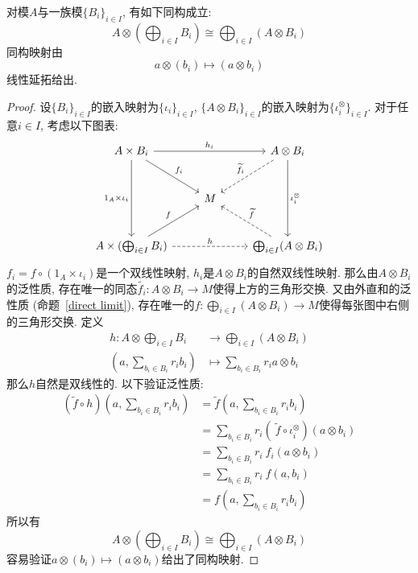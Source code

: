 \begin{prop}[分配律]\label{distribution}
    对模$A$与一族模$\{B_i\}_{i\in I}$, 有如下同构成立:
    \[A\otimes\left(\bigoplus_{i\in I}B_i\right)\cong\bigoplus_{i\in I}(A\otimes B_i)\]
    同构映射由
    \[a\otimes(b_i)\mapsto(a\otimes b_i)\]
    线性延拓给出.
\end{prop}
\begin{proof}
    设$\{B_i\}_{i\in I}$的嵌入映射为$\{\iota_i\}_{i\in I}$, $\{A\otimes B_i\}_{i\in I}$的嵌入映射为$\{\iota^\otimes_i\}_{i\in I}$.
    对于任意$i\in I$, 考虑以下图表:
    \[\begin{tikzcd}[row sep =large]
        A\times B_i \arrow[dd, "1_A\times\iota_i"'] \arrow[dr, "f_i"] \arrow[rr, "h_i"] & &
        A\otimes B_i \arrow[dl, dashed, "\widetilde{f_i}"'] \arrow[dd, "\iota^\otimes_i"] \\
        & M & \\
        A\times(\bigoplus_{i\in I}B_i) \arrow[ur, "f"] \arrow[rr, dashed, "h"] & &
        \bigoplus_{i\in I}(A\otimes B_i) \arrow[ul, dashed, "\widetilde{f}"']
    \end{tikzcd}\]
    $f_i=f\circ(1_A\times\iota_i)$是一个双线性映射, $h_i$是$A\otimes B_i$的自然双线性映射.
    那么由$A\otimes B_i$的泛性质, 存在唯一的同态$\widetilde{f_i}:A\otimes B_i\to M$使得上方的三角形交换.
    又由外直和的泛性质 (命题~\ref{direct limit}), 存在唯一的$\displaystyle f:\bigoplus_{i\in I}(A\otimes B_i)\to M$使得每张图中右侧的三角形交换.
    定义
    \begin{align*}
        h:A\otimes\bigoplus_{i\in I}B_i&\to\bigoplus_{i\in I}(A\otimes B_i)\\
        \left(a,\sum_{b_i\in B_i}r_ib_i\right)&\mapsto\sum_{b_i\in B_i}r_ia\otimes b_i
    \end{align*}
    那么$h$自然是双线性的.
    以下验证泛性质:
    \begin{align*}
        (\widetilde{f}\circ h)\left(a,\sum_{b_i\in B_i}r_ib_i\right)&=\widetilde{f}\left(a,\sum_{b_i\in B_i}r_ib_i\right)\\
        &=\sum_{b_i\in B_i}r_i(\ \widetilde{f}\circ\iota_i^\otimes)(a\otimes b_i)\\
        &=\sum_{b_i\in B_i}r_i\ f_i(a\otimes b_i)\\
        &=\sum_{b_i\in B_i}r_i\ f(a,b_i)\\
        &=f\left(a,\sum_{b_i\in B_i}r_ib_i\right)
    \end{align*}
    所以有
    \[A\otimes\left(\bigoplus_{i\in I}B_i\right)\cong\bigoplus_{i\in I}(A\otimes B_i)\]
    容易验证$a\otimes(b_i)\mapsto(a\otimes b_i)$给出了同构映射.
\end{proof}

